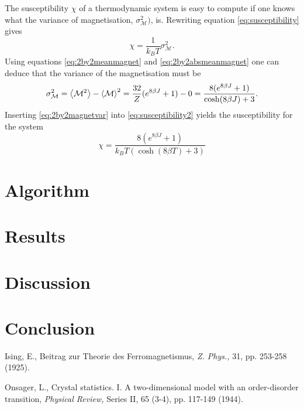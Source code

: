 \documentclass[10pt,a4paper]{amsart}
\begin{document}
The susceptibility $\chi$ of a thermodynamic system is easy to compute if one knows what the variance of magnetisation, $\sigma_{\mathcal{M}}^2)$, is. Rewriting equation \ref{eq:susceptibility} gives
\begin{equation}
\label{eq:susceptibility2}
\chi = \frac{1}{k_BT}\sigma_{\mathcal{M}}^2.
\end{equation}
Using equations \ref{eq:2by2meanmagnet} and \ref{eq:2by2absmeanmagnet} one can deduce that the variance of the magnetisation must be
\begin{equation}
\label{eq:2by2magnetvar}
\sigma_{\mathcal{M}}^2 = \ev{\mathcal{M}^2} - \ev{\mathcal{M}}^2 = \frac{32}{Z}(e^{8\beta J} +1) - 0 = \frac{8(e^{8\beta J} + 1)}{\cosh(8\beta J) + 3}.
\end{equation}
Inserting \ref{eq:2by2magnetvar} into \ref{eq:susceptibility2} yields the susceptibility for the system
\begin{equation}
\label{eq:2by2susceptibility}
\chi = \frac{8(e^{8\beta J}+1)}{k_BT(\cosh(8\beta T) + 3)}
\end{equation}

\section{Algorithm}

\section{Results}

\section{Discussion}

\section{Conclusion}

\begin{thebibliography}{9}

 Ising, E., Beitrag zur Theorie des Ferromagnetismus,
	\emph{Z. Phys.,} 31, pp. 253-258 (1925).

 Onsager, L., Crystal statistics. I. A two-dimensional model with an order-disorder transition,
	\emph{Physical Review,} Series II, 65 (3-4), pp. 117-149 (1944).

\end{thebibliography}
\end{document}
